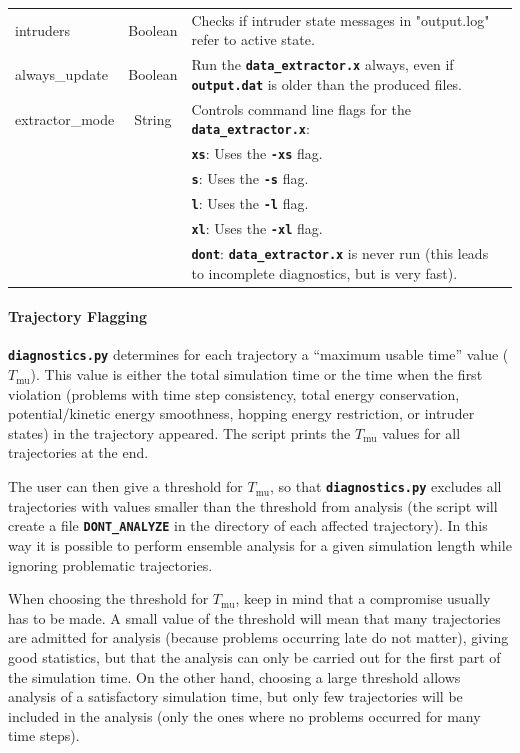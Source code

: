 \documentclass[a4paper,10pt,DIV=15,openany]{scrbook}
\newcommand{\ttt}[1]{\textbf{\texttt{#1}}}
\begin{document}
\begin{table}
\begin{tabular}{>{\ttfamily}lcp{11cm}}
    intruders           &Boolean        &Checks if intruder state messages in "output.log" refer to active state.\\
    always\_update      &Boolean        &Run the \ttt{data\_extractor.x} always, even if \ttt{output.dat} is older than the produced files.\\
    extractor\_mode     &String         &Controls command line flags for the \ttt{data\_extractor.x}:\\
                                       &&\ttt{xs}: Uses the \ttt{-xs} flag.\\
                                       &&\ttt{s}: Uses the \ttt{-s} flag.\\
                                       &&\ttt{l}: Uses the \ttt{-l} flag.\\
                                       &&\ttt{xl}: Uses the \ttt{-xl} flag.\\
                                       &&\ttt{dont}: \ttt{data\_extractor.x} is never run (this leads to incomplete diagnostics, but is very fast).\\
    \hline
  \end{tabular}
\end{table}

\paragraph{Trajectory Flagging}

\ttt{diagnostics.py} determines for each trajectory a ``maximum usable time'' value ($T_\text{mu}$).
This value is either the total simulation time or the time when the first violation (problems with time step consistency, total energy conservation, potential/kinetic energy smoothness, hopping energy restriction, or intruder states) in the trajectory appeared.
The script prints the $T_\text{mu}$ values for all trajectories at the end.

The user can then give a threshold for $T_\text{mu}$, so that \ttt{diagnostics.py} excludes all trajectories with values smaller than the threshold from analysis (the script will create a file \ttt{DONT\_ANALYZE} in the directory of each affected trajectory).
In this way it is possible to perform ensemble analysis for a given simulation length while ignoring problematic trajectories.

When choosing the threshold for $T_\text{mu}$, keep in mind that a compromise usually has to be made.
A small value of the threshold will mean that many trajectories are admitted for analysis (because problems occurring late do not matter), giving good statistics, but that the analysis can only be carried out for the first part of the simulation time.
On the other hand, choosing a large threshold allows analysis of a satisfactory simulation time, but only few trajectories will be included in the analysis (only the ones where no problems occurred for many time steps).
\end{document}
